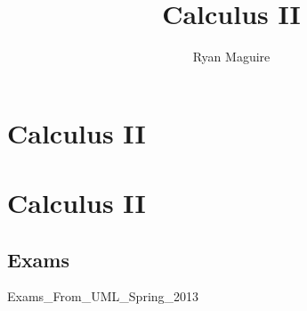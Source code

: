 \documentclass[crop=false,class=book,oneside]{standalone}
\begin{document}
    \newif\ifmathcoursescalculusII
    \ifx\ifmathcourses\undefined
        \title{Calculus II}
        \author{Ryan Maguire}
        \date{\vspace{-5ex}}
        \maketitle
        \tableofcontents
        \chapter*{Calculus II}
        \setcounter{chapter}{1}
    \else
        \chapter{Calculus II}
    \fi
    \section{Exams}
        {Exams_From_UML_Spring_2013}
\end{document}
